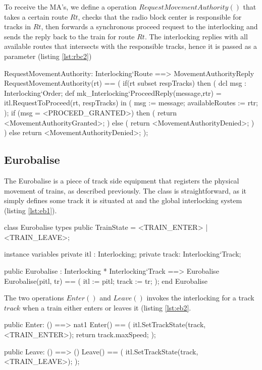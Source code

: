 \documentclass[preprint,12pt]{elsarticle}
\begin{document}
To receive the MA's, we define a operation $RequestMovementAuthority()$ that takes a certain route $Rt$, checks that the radio block center is responsible for tracks in $Rt$, then forwards a synchronous proceed request to the interlocking and sends the reply back to the train for route $Rt$. The interlocking replies with all available routes that intersects with the responsible tracks, hence it is passed as a parameter (listing \ref{lst:rbc2})

\begin{vdmsl}[label=lst:rbc2,caption=Definition of the public.]
	RequestMovementAuthority: Interlocking`Route
	 ==> MovementAuthorityReply
	RequestMovementAuthority(rt) ==
	(
	if(rt subset respTracks) then (
		dcl msg : Interlocking`Order;
		def mk_Interlocking`ProceedReply(message,rtr)
			 = itl.RequestToProceed(rt, respTracks)
		in ( msg := message; availableRoutes := rtr; );
			if (msg = <PROCEED_GRANTED>)
				then ( return <MovementAuthorityGranted>; )
			else (
				return <MovementAuthorityDenied>;
			)
		) else return <MovementAuthorityDenied>;
	);
\end{vdmsl}

\subsection{Eurobalise}

The Eurobalise is a piece of track side equipment that registers the physical movement of trains, as described previously. The class is straightforward, as it simply defines some track it is situated at and the global interlocking system (listing \ref{lst:eb1}).

\begin{vdmsl}[label=lst:eb1,caption={Types, variables, constructor for the Eurobalise.}]
class Eurobalise
types
public TrainState = <TRAIN_ENTER> | <TRAIN_LEAVE>;

instance variables
private itl : Interlocking;
private track: Interlocking`Track;

public Eurobalise : Interlocking * Interlocking`Track
 ==> Eurobalise
Eurobalise(pitl, tr) ==
(
itl := pitl;
track := tr;
);
end Eurobalise			
\end{vdmsl}

The two operations $Enter()$ and $Leave()$ invokes the interlocking for a track $track$ when a train either enters or leaves it (listing \ref{lst:eb2}.

\begin{vdmsl}[label=lst:eb2,caption={The two operations that trains call to register their movement.}]
	public Enter: () ==> nat1
	Enter() == (
		itl.SetTrackState(track, <TRAIN_ENTER>);
		return track.maxSpeed;
	);
	
	public Leave: () ==> ()
	Leave() == (
		itl.SetTrackState(track, <TRAIN_LEAVE>);
	);	
\end{vdmsl}
\end{document}
